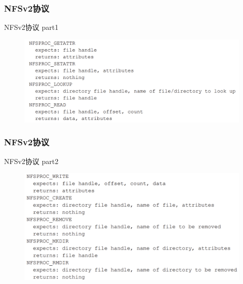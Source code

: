 \begin{frame}[fragile]
    \frametitle{NFSv2协议}
NFSv2协议 part1
    \begin{figure}
        \includegraphics[width=0.9\linewidth]{figs/nfsv2-1.png}
    \end{figure}
    
\end{frame}
\begin{frame}[fragile]
    \frametitle{NFSv2协议}
    NFSv2协议 part2
    \begin{figure}
        \includegraphics[width=0.8\linewidth]{figs/nfsv2-2.png}
    \end{figure}
    
\end{frame}


